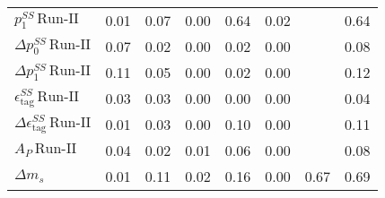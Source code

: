 \begin{tabular}{l  c  c  c  c  c  c  | c }
$p_{1}^{SS} \, \text{Run-II}$ & 0.01 & 0.07 & 0.00 & 0.64 & 0.02 &  & 0.64 \\ 
$\Delta p_{0}^{SS} \, \text{Run-II}$ & 0.07 & 0.02 & 0.00 & 0.02 & 0.00 &  & 0.08 \\ 
$\Delta p_{1}^{SS} \, \text{Run-II}$ & 0.11 & 0.05 & 0.00 & 0.02 & 0.00 &  & 0.12 \\ 
$\epsilon_{\text{tag}}^{SS} \, \text{Run-II}$ & 0.03 & 0.03 & 0.00 & 0.00 & 0.00 &  & 0.04 \\ 
$\Delta \epsilon_{\text{tag}}^{SS} \, \text{Run-II}$ & 0.01 & 0.03 & 0.00 & 0.10 & 0.00 &  & 0.11 \\ 
$A_{P} \, \text{Run-II}$ & 0.04 & 0.02 & 0.01 & 0.06 & 0.00 &  & 0.08 \\ 
$\Delta m_{s}$ & 0.01 & 0.11 & 0.02 & 0.16 & 0.00 & 0.67 & 0.69 \\ 
\hline
\hline
\end{tabular}
